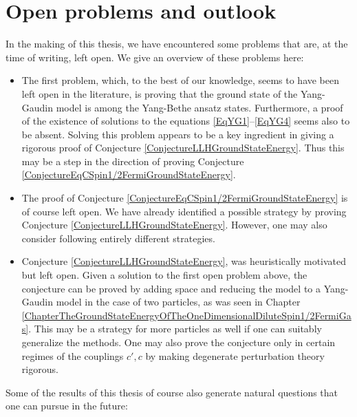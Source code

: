 \section{Open problems and outlook}
 In the making of this thesis, we have encountered some problems that are, at the time of writing, left open. We give an overview of these problems here:
 \begin{itemize}
 	\item The first problem, which, to the best of our knowledge, seems to have been left open in the literature, is proving that the ground state of the Yang-Gaudin model is among the Yang-Bethe ansatz states. Furthermore, a proof of the existence of solutions to the equations \eqref{EqYG1}--\eqref{EqYG4} seems also to be absent. Solving this problem appears to be a key ingredient in giving a rigorous proof of Conjecture \ref{ConjectureLLHGroundStateEnergy}. Thus this may be a step in the direction of proving Conjecture \ref{ConjectureEqCSpin1/2FermiGroundStateEnergy}.
 	\item The proof of Conjecture \ref{ConjectureEqCSpin1/2FermiGroundStateEnergy} is of course left open. We have already identified a possible strategy by proving Conjecture \ref{ConjectureLLHGroundStateEnergy}. However, one may also consider following entirely different strategies.
 	\item Conjecture \ref{ConjectureLLHGroundStateEnergy}, was heuristically motivated but left open. Given a solution to the first open problem above, the conjecture can be proved by adding space and reducing the model to a Yang-Gaudin model in the case of two particles, as was seen in Chapter \ref{ChapterTheGroundStateEnergyOfTheOneDimensionalDiluteSpin1/2FermiGas}. This may be a strategy for more particles as well if one can suitably generalize the methods. One may also prove the conjecture only in certain regimes of the couplings $ c',c $ by making degenerate perturbation theory rigorous.
 \end{itemize}
Some of the results of this thesis of course also generate natural questions that one can pursue in the future:
